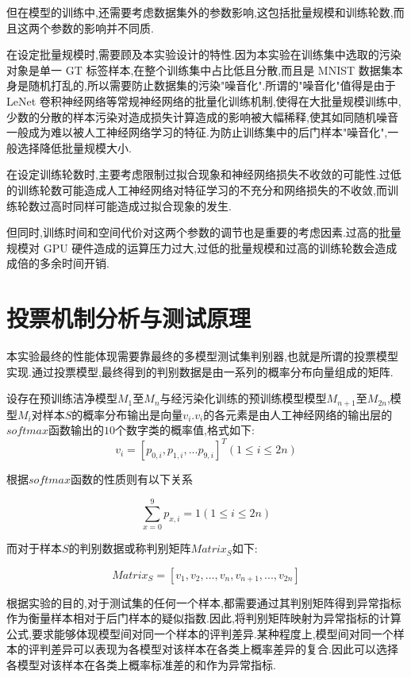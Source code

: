 但在模型的训练中,还需要考虑数据集外的参数影响,这包括批量规模和训练轮数,而且这两个参数的影响并不同质.

在设定批量规模时,需要顾及本实验设计的特性.因为本实验在训练集中选取的污染对象是单一 GT 标签样本,在整个训练集中占比低且分散,而且是 MNIST 数据集本身是随机打乱的,所以需要防止数据集的污染"噪音化".所谓的"噪音化"值得是由于 LeNet 卷积神经网络等常规神经网络的批量化训练机制,使得在大批量规模训练中,少数的分散的样本污染对造成损失计算造成的影响被大幅稀释,使其如同随机噪音一般成为难以被人工神经网络学习的特征.为防止训练集中的后门样本"噪音化",一般选择降低批量规模大小.

在设定训练轮数时,主要考虑限制过拟合现象和神经网络损失不收敛的可能性.过低的训练轮数可能造成人工神经网络对特征学习的不充分和网络损失的不收敛,而训练轮数过高时同样可能造成过拟合现象的发生.

但同时,训练时间和空间代价对这两个参数的调节也是重要的考虑因素.过高的批量规模对 GPU 硬件造成的运算压力过大,过低的批量规模和过高的训练轮数会造成成倍的多余时间开销.

\section{投票机制分析与测试原理}
本实验最终的性能体现需要靠最终的多模型测试集判别器,也就是所谓的投票模型实现.通过投票模型,最终得到的判别数据是由一系列的概率分布向量组成的矩阵.

设存在预训练洁净模型$M_1$至$M_n$与经污染化训练的预训练模型模型$M_{n+1}$至$M_{2n}$,模型$M_i$对样本$S$的概率分布输出是向量${v_i}$.$v_i$的各元素是由人工神经网络的输出层的$softmax$函数输出的$10$个数字类的概率值,格式如下:
\begin{equation}
v_i=[p_{0,i},p_{1,i},...p_{9,i}]^{T} (1 \leq i \leq 2n) 
\end{equation}

根据$softmax$函数的性质则有以下关系

\begin{equation}
\sum_{x=0}^{9} p_{x,i} = 1 (1 \leq i \leq 2n) 
\end{equation}

而对于样本$S$的判别数据或称判别矩阵$Matrix_{S}$如下:

\begin{equation}
Matrix_{S} = [v_1,v_2,...,v_n,v_{n+1},...,v_{2n}] 
\end{equation}

根据实验的目的,对于测试集的任何一个样本,都需要通过其判别矩阵得到异常指标作为衡量样本相对于后门样本的疑似指数.因此,将判别矩阵映射为异常指标的计算公式,要求能够体现模型间对同一个样本的评判差异.某种程度上,模型间对同一个样本的评判差异可以表现为各模型对该样本在各类上概率差异的复合.因此可以选择各模型对该样本在各类上概率标准差的和作为异常指标.

